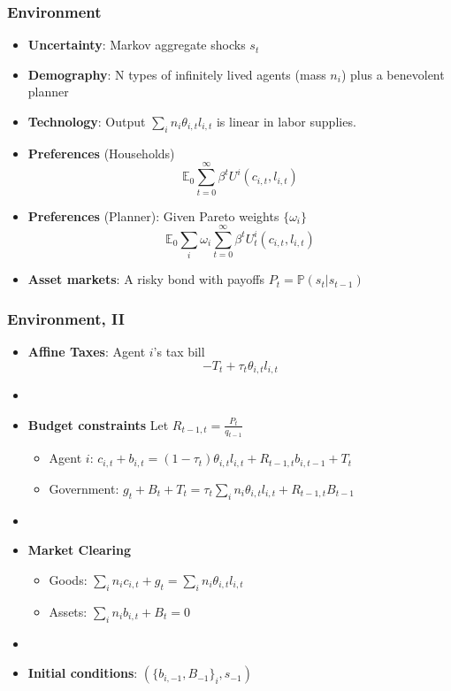 \documentclass{beamer}
\begin{document}
\begin{frame}
 \frametitle{Environment}
 \begin{itemize}
 \item \textbf{Uncertainty}: Markov aggregate shocks $s_t$
  \item \textbf{Demography}: N  types of infinitely lived agents (mass $n_i$)  plus a benevolent planner
  \item \textbf{Technology}: Output $\sum_{i}n_i \theta_{i,t} l_{i,t}$ is linear in labor supplies.
  \item \textbf{Preferences }(Households)
  \begin{equation*}
\mathbb{E}_{0}\sum_{t=0}^{\infty } \beta^t U^{i}\left(
c_{i,t},l_{i,t}\right)  \label{utility lifetime}
\end{equation*}%
\item \textbf{Preferences} (Planner): Given Pareto weights $\{\omega_i\}$
\begin{equation*}
\mathbb{E}_{0}\sum_{i} \omega_i\sum_{t=0}^{\infty }\beta^t U_{t}^{i}\left( c_{i,t},l_{i,t}\right)  \label{govmt objective}
\end{equation*}
  \item \textbf{Asset markets}: A risky bond with payoffs $P_t=\mathbb{P}(s_t|s_{t-1})$
  \end{itemize}

\end{frame}



\begin{frame}
 \frametitle{Environment, II}
 \begin{itemize}
  \item \textbf{Affine Taxes}: Agent $i$'s tax bill
\[- T_t + \tau_t \theta_{i,t}l_{i,t}\]

\item[]
  \item \textbf{Budget constraints} Let $R_{t-1,t}=\frac{P_t}{q_{t-1}}$
  \begin{itemize}
   \item Agent $i$: $ c_{i,t}+b_{i,t}=\left( 1-\tau _{t}\right) \theta _{i,t}l_{i,t}+R_{t-1,t}b_{i,t-1}+T_{t}$
\item Government: $g_{t}+B_{t}+T_t=\tau _{t}\sum_i n_i \theta_{i,t}l_{i,t}+R_{t-1,t}B_{t-1}$
  \end{itemize}

\item[]
  \item \textbf{Market Clearing}
  \begin{itemize}
   \item Goods: $\sum_{i}n_ic_{i,t}+g_t =\sum_i n_i \theta _{i,t} l_{i,t}$

   \item Assets: $\sum_{i}n_ib_{i,t} +B_{t}=0$

  \end{itemize}
  \item[]

\item \textbf{Initial conditions}:  $(\{b_{i,-1},B_{-1}\}_i,s_{-1})$
\end{itemize}
\end{frame}
\end{document}
